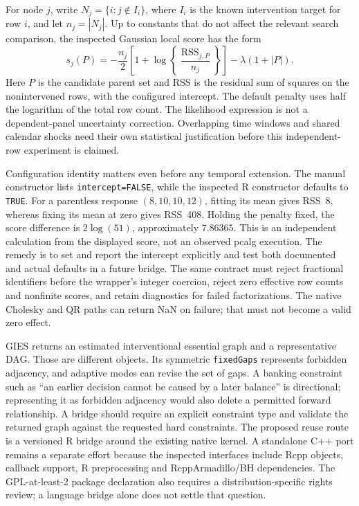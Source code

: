 For node $j$, write $N_j=\{i:j\notin I_i\}$, where $I_i$ is the known
intervention target for row $i$, and let $n_j=|N_j|$. Up to constants that do
not affect the relevant search comparison, the inspected Gaussian local score
has the form
\[
 s_j(P)=-\frac{n_j}{2}\left[1+\log\left\{
       \frac{\operatorname{RSS}_{j,P}}{n_j}\right\}\right]
       -\lambda(1+|P|).
\]
Here $P$ is the candidate parent set and RSS is the residual sum of squares
on the nonintervened rows, with the configured intercept. The default penalty
uses half the logarithm of the total row count. The likelihood expression is
not a dependent-panel uncertainty correction. Overlapping time windows and
shared calendar shocks need their own statistical justification before this
independent-row experiment is claimed.

Configuration identity matters even before any temporal extension. The
manual constructor lists \texttt{intercept=FALSE}, while the inspected R
constructor defaults to \texttt{TRUE}. For a parentless response
$(8,10,10,12)$, fitting its mean gives RSS~8, whereas fixing its mean at zero
gives RSS~408. Holding the penalty fixed, the score difference is
$2\log(51)$, approximately $7.86365$. This is an independent calculation from
the displayed score, not an observed pcalg execution. The remedy is to set and
report the intercept explicitly and test both documented and actual defaults
in a future bridge. The same contract must reject fractional identifiers
before the wrapper's integer coercion, reject zero effective row counts and
nonfinite scores, and retain diagnostics for failed factorizations. The native
Cholesky and QR paths can return NaN on failure; that must not become a valid
zero effect. \citep{exec16_ct_pcalg,exec16_ct_oracle}

GIES returns an estimated interventional essential graph and a representative
DAG. Those are different objects. Its symmetric \texttt{fixedGaps} represents
forbidden adjacency, and adaptive modes can revise the set of gaps. A banking
constraint such as ``an earlier decision cannot be caused by a later balance''
is directional; representing it as forbidden adjacency would also delete a
permitted forward relationship. A bridge should require an explicit constraint
type and validate the returned graph against the requested hard constraints.
The proposed reuse route is a versioned R bridge around the existing native
kernel. A standalone C++ port remains a separate effort because the inspected
interfaces include Rcpp objects, callback support, R preprocessing and
RcppArmadillo/BH dependencies. The GPL-at-least-2 package declaration also
requires a distribution-specific rights review; a language bridge alone does
not settle that question. \citep{exec16_ct_pcalg}

